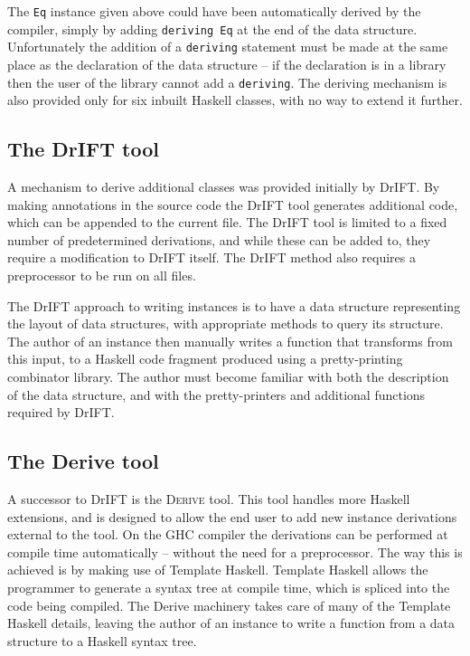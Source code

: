 \documentclass{llncs}
\newcommand{\derive}{\textsc{Derive}}
\newcommand{\T}[1]{\texttt{#1}}
\begin{document}
The \T{Eq} instance given above could have been automatically derived by the compiler, simply by adding \T{deriving Eq} at the end of the data structure. Unfortunately the addition of a \T{deriving} statement must be made at the same place as the declaration of the data structure -- if the declaration is in a library then the user of the library cannot add a \T{deriving}. The deriving mechanism is also provided only for six inbuilt Haskell classes, with no way to extend it further.

\subsection{The DrIFT tool}

A mechanism to derive additional classes was provided initially by DrIFT. By making annotations in the source code the DrIFT tool generates additional code, which can be appended to the current file. The DrIFT tool is limited to a fixed number of predetermined derivations, and while these can be added to, they require a modification to DrIFT itself. The DrIFT method also requires a preprocessor to be run on all files.

The DrIFT approach to writing instances is to have a data structure representing the layout of data structures, with appropriate methods to query its structure. The author of an instance then manually writes a function that transforms from this input, to a Haskell code fragment produced using a pretty-printing combinator library. The author must become familiar with both the description of the data structure, and with the pretty-printers and additional functions required by DrIFT.

\subsection{The Derive tool}

A successor to DrIFT is the \derive{} tool. This tool handles more Haskell extensions, and is designed to allow the end user to add new instance derivations external to the tool. On the GHC compiler the derivations can be performed at compile time automatically -- without the need for a preprocessor. The way this is achieved is by making use of Template Haskell. Template Haskell allows the programmer to generate a syntax tree at compile time, which is spliced into the code being compiled. The Derive machinery takes care of many of the Template Haskell details, leaving the author of an instance to write a function from a data structure to a Haskell syntax tree.
\end{document}

